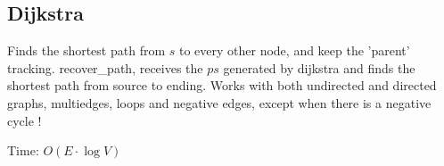 \subsection {Dijkstra}

Finds the shortest path from $ s $ to every other node, and keep the 'parent' tracking. recover\_path, receives the $ ps $ generated by dijkstra and finds the shortest path from source to ending. Works with both undirected and directed graphs, multiedges, loops and negative edges, except when there is a negative cycle !

Time: $O(E \cdot \log{V})$


